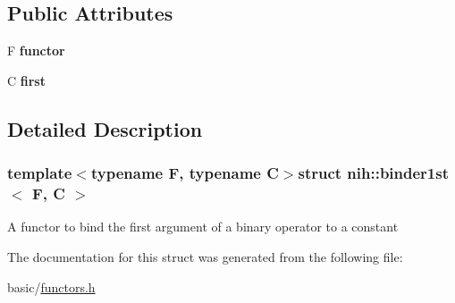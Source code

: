 \subsection*{\-Public \-Attributes}
\begin{DoxyCompactItemize}
\item 
\hypertarget{structnih_1_1binder1st_a06a83ba82d6042dedca47d9aed655cea}{
\-F {\bfseries functor}}
\label{structnih_1_1binder1st_a06a83ba82d6042dedca47d9aed655cea}

\item 
\hypertarget{structnih_1_1binder1st_aa0c033fa838a15f9bba5b02a5bcbe6c7}{
\-C {\bfseries first}}
\label{structnih_1_1binder1st_aa0c033fa838a15f9bba5b02a5bcbe6c7}

\end{DoxyCompactItemize}


\subsection{\-Detailed \-Description}
\subsubsection*{template$<$typename \-F, typename \-C$>$struct nih\-::binder1st$<$ F, C $>$}

\-A functor to bind the first argument of a binary operator to a constant 

\-The documentation for this struct was generated from the following file\-:\begin{DoxyCompactItemize}
\item 
basic/\hyperlink{functors_8h}{functors.\-h}\end{DoxyCompactItemize}
